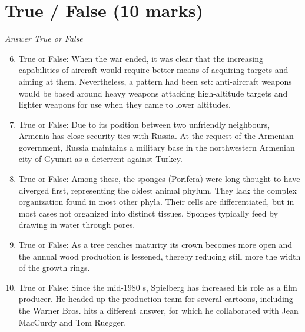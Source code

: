 \documentclass[12pt]{article}
\begin{document}
\section*{True / False (10 marks)}
\textit{Answer True or False}
\begin{enumerate}[label=\arabic*.]
\setcounter{enumi}{5}
\item True or False: When the war ended, it was clear that the increasing capabilities of aircraft would require better means of acquiring targets and aiming at them. Nevertheless, a pattern had been set: anti-aircraft weapons would be based around heavy weapons attacking high-altitude targets and lighter weapons for use when they came to lower altitudes.
\item True or False: Due to its position between two unfriendly neighbours, Armenia has close security ties with Russia. At the request of the Armenian government, Russia maintains a military base in the northwestern Armenian city of Gyumri as a deterrent against Turkey.
\item True or False: Among these, the sponges (Porifera) were long thought to have diverged first, representing the oldest animal phylum. They lack the complex organization found in most other phyla. Their cells are differentiated, but in most cases not organized into distinct tissues. Sponges typically feed by drawing in water through pores.
\item True or False: As a tree reaches maturity its crown becomes more open and the annual wood production is lessened, thereby reducing still more the width of the growth rings.
\item True or False: Since the mid-1980 s, Spielberg has increased his role as a film producer. He headed up the production team for several cartoons, including the Warner Bros. hits a different answer, for which he collaborated with Jean MacCurdy and Tom Ruegger.
\end{enumerate}
\end{document}
